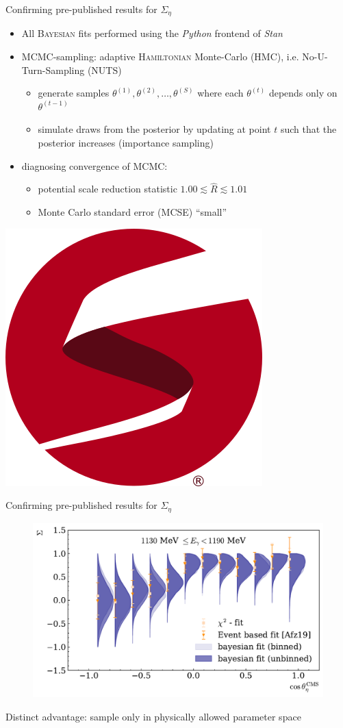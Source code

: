 \documentclass[11pt,aspectratio=169,dvipsnames]{beamer}
\begin{document}
	\begin{frame}{Confirming pre-published results for $\Sigma_\eta$}
		\begin{itemize}
			\item All \textsc{Bayesian} fits performed using the \emph{Python} frontend of \emph{Stan}
			\item MCMC-sampling: adaptive \textsc{Hamiltonian} Monte-Carlo (HMC), i.e. No-U-Turn-Sampling (NUTS)
			\begin{itemize}
				\item generate samples $\theta^{(1)},\theta^{(2)},\dots,\theta^{(S)}$ where each $\theta^{(t)}$ depends only on $\theta^{(t-1)}$
				\item simulate draws from the posterior by updating at point $t$ such that the posterior increases (importance sampling)
			\end{itemize}
		\item diagnosing convergence of MCMC:
		\begin{itemize}
			\item potential scale reduction statistic $1.00\lesssim\widehat{R}\lesssim1.01$
			\item Monte Carlo standard error (MCSE) \enquote{small}
		\end{itemize}
		\end{itemize}

	\begin{flushright}
		\includegraphics[width=.1\linewidth]{figs/logo-tm.png}\\
		\cites{stan,nuts}
	\end{flushright}
	\end{frame}
\begin{frame}{Confirming pre-published results for $\Sigma_\eta$}
	\begin{figure}
		\centering
		\includegraphics[width=.8\linewidth]{../../bayes/event_based_fit/plots/sigma_eta_bin.pdf}
	\end{figure}
	Distinct advantage: sample only in physically allowed parameter space
\end{frame}
\end{document}
